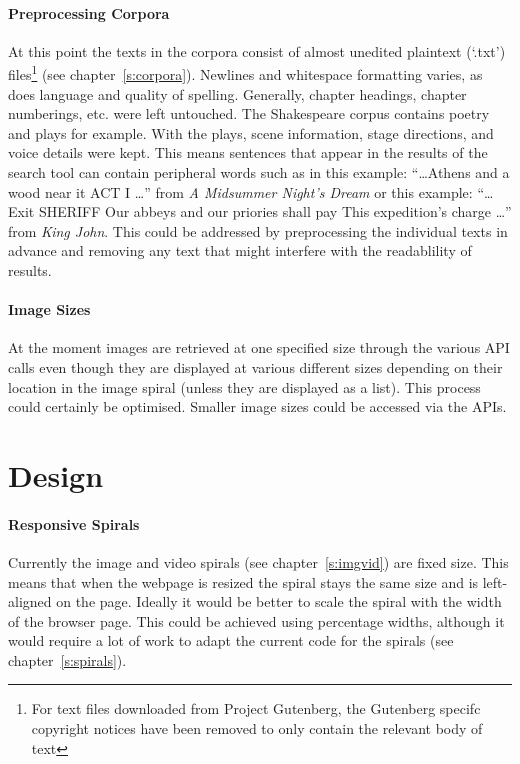 \documentclass[11pt]{thesis} %
\begin{document}
\paragraph{Preprocessing Corpora} 
At this point the texts in the corpora consist of almost unedited plaintext (`.txt') files\footnote{For text files downloaded from Project Gutenberg, the Gutenberg specifc copyright notices have been removed to only contain the relevant body of text} (see chapter~\ref{s:corpora}). Newlines and whitespace formatting varies, as does language and quality of spelling. Generally, chapter headings, chapter numberings, etc. were left untouched. The Shakespeare corpus contains poetry and plays for example. With the plays, scene information, stage directions, and voice details were kept. This means sentences that appear in the results of the search tool can contain peripheral words such as in this example: ``\ldots Athens and a wood near it ACT I \ldots'' from \textit{A Midsummer Night's Dream} or this example: ``\ldots Exit SHERIFF Our abbeys and our priories shall pay This expedition's charge \ldots'' from \textit{King John}. This could be addressed by preprocessing the individual texts in advance and removing any text that might interfere with the readablility of results.

\paragraph{Image Sizes} 
At the moment images are retrieved at one specified size through the various \ac{API} calls even though they are displayed at various different sizes depending on their location in the image spiral (unless they are displayed as a list). This process could certainly be optimised. Smaller image sizes could be accessed via the \ac{API}s.


\section{Design}


\paragraph{Responsive Spirals} 
Currently the image and video spirals (see chapter~\ref{s:imgvid}) are fixed size. This means that when the webpage is resized the spiral stays the same size and is left-aligned on the page. Ideally it would be better to scale the spiral with the width of the browser page. This could be achieved using percentage widths, although it would require a lot of work to adapt the current code for the spirals (see chapter~\ref{s:spirals}).
\end{document}
